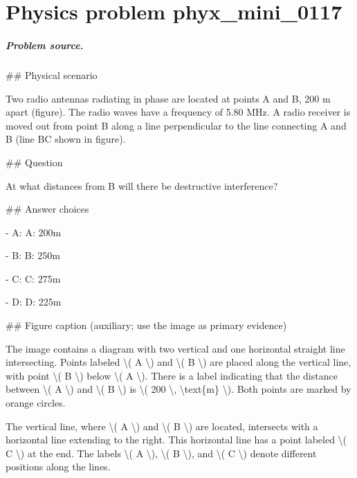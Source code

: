 
\chapter{Physics problem phyx\_mini\_0117}
\label{ch:PhyXMiniProblems_problem_phyx_mini_0117}

\paragraph{Problem source.}
\#\# Physical scenario

Two radio antennas radiating in phase are located at points A and B, 200 m apart (figure). The radio waves have a frequency of 5.80 MHz. A radio receiver is moved out from point B along a line perpendicular to the line connecting A and B (line BC shown in figure).

\#\# Question

At what distances from B will there be destructive interference?

\#\# Answer choices

- A: A: 200m

- B: B: 250m

- C: C: 275m

- D: D: 225m

\#\# Figure caption (auxiliary; use the image as primary evidence)

The image contains a diagram with two vertical and one horizontal straight line intersecting. Points labeled \textbackslash{}( A \textbackslash{}) and \textbackslash{}( B \textbackslash{}) are placed along the vertical line, with point \textbackslash{}( B \textbackslash{}) below \textbackslash{}( A \textbackslash{}). There is a label indicating that the distance between \textbackslash{}( A \textbackslash{}) and \textbackslash{}( B \textbackslash{}) is \textbackslash{}( 200 \textbackslash{}, \textbackslash{}text\{m\} \textbackslash{}). Both points are marked by orange circles.

The vertical line, where \textbackslash{}( A \textbackslash{}) and \textbackslash{}( B \textbackslash{}) are located, intersects with a horizontal line extending to the right. This horizontal line has a point labeled \textbackslash{}( C \textbackslash{}) at the end. The labels \textbackslash{}( A \textbackslash{}), \textbackslash{}( B \textbackslash{}), and \textbackslash{}( C \textbackslash{}) denote different positions along the lines.

